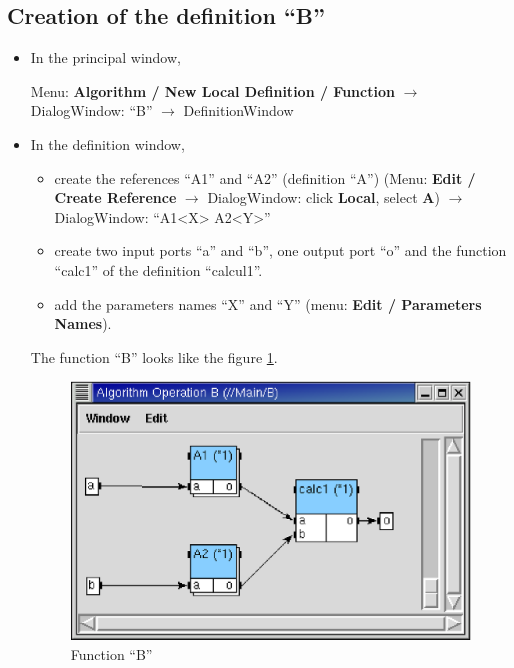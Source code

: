 \documentclass[a4paper,twoside]{report}
\begin{document}
\subsection{Creation of the definition ``B''}
\begin{itemize}
\item In the principal window,

 Menu: \textbf{Algorithm / New Local Definition / Function} $\rightarrow$
DialogWindow: ``B'' $\rightarrow$ DefinitionWindow

\item In the definition window,
\begin{itemize}
\item create the references ``A1'' and ``A2'' (definition ``A'') (Menu:
\textbf{Edit / Create Reference} $\rightarrow$ DialogWindow: click
\textbf{Local}, select \textbf{A}) $\rightarrow$ DialogWindow: ``A1<X> A2<Y>''

\item create two input ports ``a'' and ``b'', one output port ``o'' and the
function ``calc1'' of the definition ``calcul1''.

\item add the parameters names ``X'' and ``Y'' (menu: \textbf{Edit / Parameters
Names}).
\end{itemize}

The function ``B'' looks like the figure \ref{B}.
\begin{figure}[htbp]
  \begin{center} 
        \includegraphics[width=0.67\linewidth]{OperationB.eps} 
  \end{center}
  \caption{Function ``B''} 
  \label{B}
\end{figure}

\end{itemize}
\end{document}
